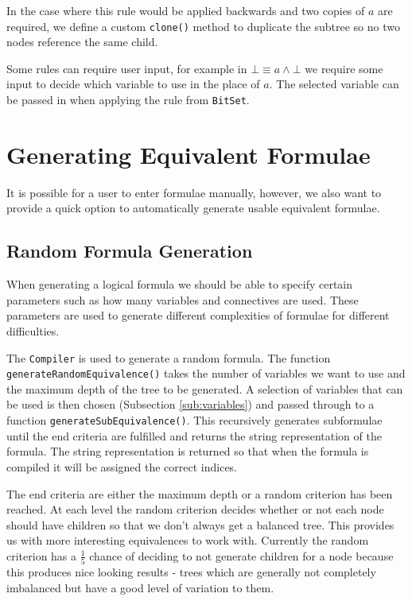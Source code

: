 \documentclass[draft]{report}
\begin{document}
In the case where this rule would be applied backwards and two copies of $a$ are required, we define a custom {\tt clone()} method to duplicate the subtree so no two nodes reference the same child.

Some rules can require user input, for example in $\bot \equiv a \land\bot$ we require some input to decide which variable to use in the place of $a$. The selected variable can be passed in when applying the rule from {\tt BitSet}.

\section{Generating Equivalent Formulae}
\label{sec:generating_equivalent_formulae}

It is possible for a user to enter formulae manually, however, we also want to provide a quick option to automatically generate usable equivalent formulae.

\subsection{Random Formula Generation}
\label{sub:random_formula_generation}

When generating a logical formula we should be able to specify certain parameters such as how many variables and connectives are used. These parameters are used to generate different complexities of formulae for different difficulties.

The {\tt Compiler} is used to generate a random formula. The function {\tt generateRandomEquivalence()} takes the number of variables we want to use and the maximum depth of the tree to be generated. A selection of variables that can be used is then chosen (Subsection \ref{sub:variables}) and passed through to a function {\tt generateSubEquivalence()}. This recursively generates subformulae until the end criteria are fulfilled and returns the string representation of the formula. The string representation is returned so that when the formula is compiled it will be assigned the correct indices.

The end criteria are either the maximum depth or a random criterion has been reached. At each level the random criterion decides whether or not each node should have children so that we don't always get a balanced tree. This provides us with more interesting equivalences to work with. Currently the random criterion has a $\frac{1}{5}$ chance of deciding to not generate children for a node because this produces nice looking results - trees which are generally not completely imbalanced but have a good level of variation to them. 
\end{document}
